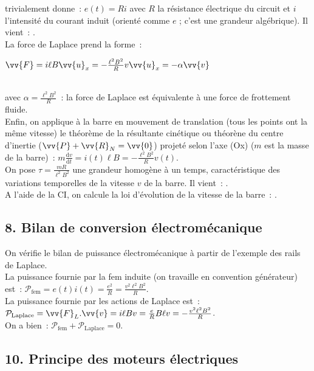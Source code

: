 \documentclass{article}
\newcommand{\mathcolorbox}[2]{\colorbox{#1}{$#2$}}
\renewcommand\overrightarrow{\vv}
\begin{document}
\begin{itemize}
trivialement donne : $e(t) = Ri$ avec $R$ la résistance électrique
du circuit et $i$ l'intensité du courant induit (orienté comme $e$ ;
c'est une grandeur algébrique).
Il vient : . \\
La force de Laplace prend la forme : \\
\centerline{\mathcolorbox{gray!20}{\overrightarrow{F} =i\ell B\overrightarrow{u}_{x} =
-\frac{\ell^{2}B^{2}}{R}v\overrightarrow{u}_{x} = -\alpha
\overrightarrow{v}}} \\
avec $\alpha = \frac{\ell^{2}B^{2}}{R}$ : la
force de Laplace est équivalente à une force de frottement fluide.
\\
Enfin, on applique à la barre en mouvement de translation (tous les
points ont la même vitesse) le théorème de la résultante cinétique
ou théorène du centre d'inertie
($\overrightarrow{P}+\overrightarrow{R}_{N} = \overrightarrow{0}$)
projeté selon l'axe (Ox) ($m$ est la masse de la barre) :
$m\frac{\mathrm{d}v}{\mathrm{d}t} = i(t)\ell B = -\frac{\ell^{2}B^{2}}{R}v(t)$. \\
On pose $\tau = \frac{mR}{\ell^{2}B^{2}}$ une grandeur homogène à un
temps, caractéristique des variations temporelles de la vitesse $v$
de la barre. Il vient : .
\\
A l'aide de la CI, on calcule la loi d'évolution de la vitesse de la
barre : .
\end{itemize}

\subsection*{8. Bilan de conversion électromécanique}
On vérifie le bilan de puissance électromécanique à partir de
l'exemple des rails de Laplace. \\
La puissance fournie par la fem induite (on travaille en convention
générateur) est : $\mathcal{P}_{\mathrm{fem}} =
e(t)i(t) = \frac{e^{2}}{R} = \frac{v^{2}\ell^{2}B^{2}}{R}$. \\
La puissance fournie par les actions de Laplace est :
$\mathcal{P}_{\mathrm{Laplace}} = \overrightarrow{F}_{L}.\overrightarrow{v} =
i\ell B v = \frac{e}{R}B\ell v = -\frac{v^{2}\ell^{2} B^{2}}{R}$. \\
On a bien : $\mathcal{P}_{\mathrm{fem}}+\mathcal{P}_{\mathrm{Laplace}} = 0$.

\subsection*{10. Principe des moteurs électriques}
\end{document}
